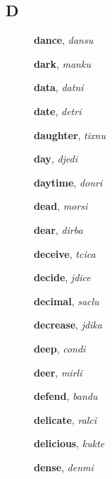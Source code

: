 \documentclass[12pt]{book}
\begin{document}
\subsection{D} %

\begin{description}

\item[ ] \textbf{dance}, \textit{dansu}

\item[ ] \textbf{dark}, \textit{manku}

\item[ ] \textbf{data}, \textit{datni}

\item[ ] \textbf{date}, \textit{detri}

\item[ ] \textbf{daughter}, \textit{tixnu}

\item[ ] \textbf{day}, \textit{djedi}

\item[ ] \textbf{daytime}, \textit{donri}

\item[ ] \textbf{dead}, \textit{morsi}

\item[ ] \textbf{dear}, \textit{dirba}

\item[ ] \textbf{deceive}, \textit{tcica}

\item[ ] \textbf{decide}, \textit{jdice}

\item[ ] \textbf{decimal}, \textit{saclu}

\item[ ] \textbf{decrease}, \textit{jdika}

\item[ ] \textbf{deep}, \textit{condi}

\item[ ] \textbf{deer}, \textit{mirli}

\item[ ] \textbf{defend}, \textit{bandu}

\item[ ] \textbf{delicate}, \textit{ralci}

\item[ ] \textbf{delicious}, \textit{kukte}

\item[ ] \textbf{dense}, \textit{denmi}


\end{description}
\end{document}

